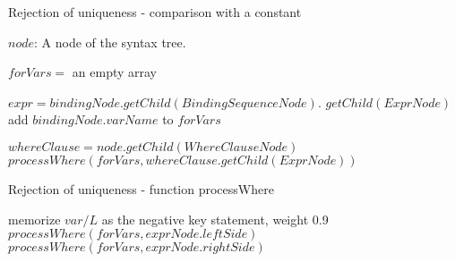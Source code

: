 \begin{algorithm}
\caption{Rejection of uniqueness - comparison with a constant}
\label{ALG_rejection_of_uniqueness_comparison_with_a_constant}
\begin{algorithmic}[1]
\REQUIRE $node$: A node of the syntax tree.

	\STATE $forVars =$ an empty array

            \STATE $expr = bindingNode.getChild(BindingSequenceNode).$ $getChild(ExprNode)$
                \STATE add $bindingNode.varName$ to $forVars$
            \ENDIF
        \ENDIF
    \ENDFOR
    
    \STATE $whereClause = node.getChild(WhereClauseNode)$
    	\STATE $processWhere(forVars, whereClause.getChild(ExprNode))$
	\ENDIF
\ENDIF
\end{algorithmic}
\end{algorithm}

\begin{algorithm}
\caption{Rejection of uniqueness - function processWhere}
\label{ALG_rejection_of_uniqueness_function_process_where}
\begin{algorithmic}[1]

                \STATE memorize $var/L$ as the negative key statement, weight 0.9
            \ENDIF
        \ENDFOR
        \STATE $processWhere(forVars, exprNode.leftSide)$
        \STATE $processWhere(forVars, exprNode.rightSide)$
    \ENDIF
\ENDIF
\end{algorithmic}
\end{algorithm}
